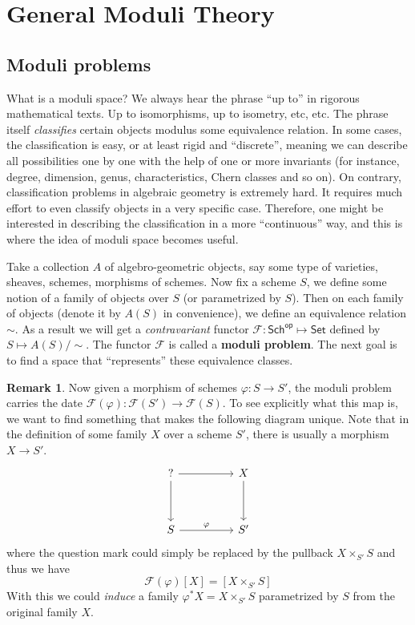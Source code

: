 \documentclass[12pt]{article}
\theoremstyle{remark}
\theoremstyle{definition}
\newtheorem{remark}{Remark}[section]
\newcommand{\Sch}[0]{\mathsf{Sch}}
\newcommand{\Set}[0]{\mathsf{Set}}
\newcommand{\op}[0]{\mathsf{op}}
\begin{document}
    \section{General Moduli Theory}
    \subsection{Moduli problems}
    What is a moduli space? We always hear the phrase ``up to'' in rigorous mathematical texts. Up to isomorphisms, up to isometry, etc, etc. The phrase itself \textit{classifies} certain objects modulus some equivalence relation. In some cases, the classification is easy, or at least rigid and ``discrete'', meaning we can describe all possibilities one by one with the help of one or more invariants (for instance, degree, dimension, genus, characteristics, Chern classes and so on). On contrary, classification problems in algebraic geometry is extremely hard. It requires much effort to even classify objects in a very specific case. Therefore, one might be interested in describing the classification in a more ``continuous'' way, and this is where the idea of moduli space becomes useful.

    Take a collection $A$ of algebro-geometric objects, say some type of varieties, sheaves, schemes, morphisms of schemes. Now fix a scheme $S$, we define some notion of a family of objects over $S$ (or parametrized by $S$). Then on each family of objects (denote it by $A(S)$ in convenience), we define an equivalence relation $\sim$. As a result we will get a \textit{contravariant} functor $\mathcal F:\Sch^\op\mapsto \Set$ defined by $S\mapsto A(S)/{\sim}$. The functor $\mathcal F$ is called a \textbf{moduli problem}. The next goal is to find a space that ``represents'' these equivalence classes.
    \begin{remark}
        Now given a morphism of schemes $\varphi:S\to S'$, the moduli problem carries the date $\mathcal F(\varphi):\mathcal F(S')\to \mathcal F(S)$. To see explicitly what this map is, we want to find something that makes the following diagram unique. Note that in the definition of some family $X$ over a scheme $S'$, there is usually a morphism $X\to S'$.
        \[\begin{tikzcd}
            ? \arrow[rr] \arrow[dd] &  & X \arrow[dd] \\
                                    &  &              \\
            S \arrow[rr, "\varphi"] &  & S'          
            \end{tikzcd}\]
        where the question mark could simply be replaced by the pullback $X\times_{S'}S$ and thus we have
        \[\mathcal F(\varphi)[X]=[X\times_{S'}S]\]
        With this we could \textit{induce} a family $\varphi^*X=X\times_{S'}S$ parametrized by $S$ from the original family $X$.
    \end{remark}
\end{document}
